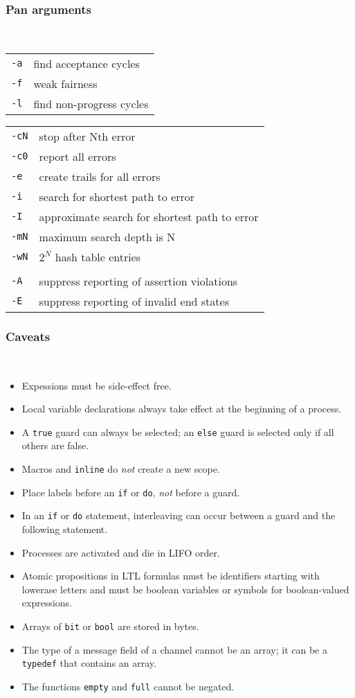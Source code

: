 \documentclass{leaflet}
\newcommand{\sct}[1]{\subsubsection{#1}\mbox{}\\}
\begin{document}
\sct{Pan arguments}
\begin{tabular}{ll}
\texttt{-a} & find acceptance cycles\\
\texttt{-f} & weak fairness\\
\texttt{-l} & find non-progress cycles
\end{tabular}

\newpage

\begin{tabular}{ll}
\texttt{-cN} & stop after Nth error\\
\texttt{-c0} & report all errors\\
\texttt{-e} & create trails for all errors\\
\texttt{-i} & search for shortest path to error\\
\texttt{-I} & approximate search for shortest path to error\\
\texttt{-mN} & maximum search depth is N\\
\texttt{-wN} & $2^{N}$ hash table entries\\
\\
\texttt{-A} & suppress reporting of assertion violations\\
\texttt{-E} & suppress reporting of invalid end states
\end{tabular}

\sct{Caveats}
\vspace*{-2ex}
\begin{itemize}
\item Expessions must be side-effect free.
\item Local variable declarations always take effect at the beginning of a process.
\item A \texttt{true} guard can always be selected; an \texttt{else} guard is selected only if all others are false.
\item Macros and \texttt{inline} do \emph{not} create a new scope.
\item Place labels before an \texttt{if} or \texttt{do}, \emph{not} before a guard.
\item In an \texttt{if} or \texttt{do} statement, interleaving can occur between a guard and the following statement.
\item Processes are activated and die in LIFO order.
\item Atomic propositions in LTL formulas must be identifiers starting with lowerase letters and must be boolean variables or symbols for boolean-valued expressions. 
\item Arrays of \texttt{bit} or \texttt{bool} are stored in bytes.
\item The type of a message field of a channel cannot be an array;
it can be a \texttt{typedef} that contains an array.
\item The functions \texttt{empty} and \texttt{full} cannot be negated.
\end{itemize}
\end{document}
